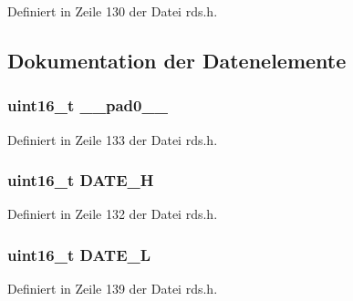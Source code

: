 Definiert in Zeile 130 der Datei rds.\+h.



\subsection{Dokumentation der Datenelemente}
\hypertarget{structgroup__4a_a77132c2c26a75f5b8751b235cda23828}{}
\subsubsection[{\+\_\+\+\_\+pad0\+\_\+\+\_\+}]{\setlength{\rightskip}{0pt plus 5cm}uint16\+\_\+t \+\_\+\+\_\+pad0\+\_\+\+\_\+}\label{structgroup__4a_a77132c2c26a75f5b8751b235cda23828}


Definiert in Zeile 133 der Datei rds.\+h.

\hypertarget{structgroup__4a_a3e79884699012bd2127da5d0d474072b}{}
\subsubsection[{D\+A\+T\+E\+\_\+\+H}]{\setlength{\rightskip}{0pt plus 5cm}uint16\+\_\+t D\+A\+T\+E\+\_\+\+H}\label{structgroup__4a_a3e79884699012bd2127da5d0d474072b}


Definiert in Zeile 132 der Datei rds.\+h.

\hypertarget{structgroup__4a_a41f1477fa1205c5f2c4135c43419f931}{}
\subsubsection[{D\+A\+T\+E\+\_\+\+L}]{\setlength{\rightskip}{0pt plus 5cm}uint16\+\_\+t D\+A\+T\+E\+\_\+\+L}\label{structgroup__4a_a41f1477fa1205c5f2c4135c43419f931}


Definiert in Zeile 139 der Datei rds.\+h.

\hypertarget{structgroup__4a_a66d4119990dc4c3e040a43885e9bb953}{}
